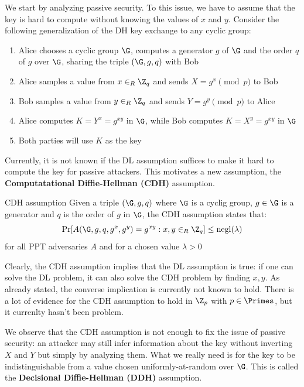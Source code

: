\documentclass[a4paper, 12pt]{report}
\begin{document}
    We start by analyzing passive security. To  this issue, we have to assume that the key is hard to compute without knowing the values of $x$ and $y$. Consider the following generalization of the DH key exchange to any cyclic group:
    \begin{enumerate}
        \item Alice chooses a cyclic group $\G$, computes a generator $g$ of $\G$ and the order $q$ of $g$ over $\G$, sharing the triple $(\G,g,q)$ with Bob
        \item Alice samples a value from $x \in_R \Z_q$ and sends $X = g^{x} \pmod p$ to Bob
        \item Bob samples a value from $y \in_R \Z_q$ and sends $Y = g^{y} \pmod p$ to Alice
        \item Alice computes $K = Y^x = g^{xy}$ in $\G$, while Bob computes $K = X^y = g^{xy}$ in $\G$
        \item Both parties will use $K$ as the key
    \end{enumerate}

    Currently, it is not known if the DL assumption suffices to make it hard to compute the key for passive attackers. This motivates a new assumption, the \textbf{Computatational Diffie-Hellman (CDH)} assumption.

    \begin{framedass}{CDH assumption}
        Given a triple $(\G,g,q)$ where $\G$ is a cyclig group, $g \in \G$ is a generator and $q$ is the order of $g$ in $\G$, the CDH assumption states that:
        \[\Pr[A(\G,g,q,g^x,g^y) = g^{xy} : x,y \in_R \Z_q] \leq \mathrm{negl}(\lambda)\]
        for all PPT adversaries $A$ and for a chosen value $\lambda > 0$
    \end{framedass}

    Clearly, the CDH assumption implies that the DL assumption is true: if one can solve the DL problem, it can also solve the CDH problem by finding $x,y$. As already stated, the converse implication is currently not known to hold. There is a lot of evidence for the CDH assumption to hold in $\Z_p$ with $p \in \Primes$, but it currenlty hasn't been problem.

    We observe that the CDH assumption is not enough to fix the issue of passive security: an attacker may still infer information about the key without inverting $X$ and $Y$ but simply by analyzing them. What we really need is for the key to be indistinguishable from a value chosen uniformly-at-random over $\G$. This is called the \textbf{Decisional Diffie-Hellman (DDH)} assumption.
\end{document}
